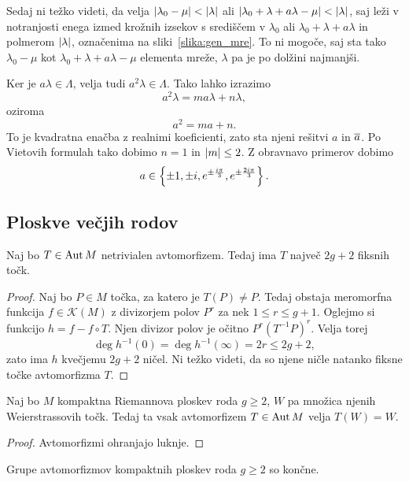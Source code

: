 Sedaj ni težko videti, da velja
$\left\lvert \lambda_0 - \mu\right\rvert < \left\lvert \lambda\right\rvert$ ali
$\left\lvert \lambda_0 + \lambda + a \lambda - \mu\right\rvert < \left\lvert \lambda\right\rvert$, saj
leži v notranjosti enega izmed krožnih izsekov s središčem v
$\lambda_0$ ali $\lambda_0 + \lambda + a \lambda$ in polmerom
$\left\lvert \lambda\right\rvert$, označenima na sliki~\ref{slika:gen_mre}. To ni
mogoče, saj sta tako $\lambda_0 - \mu$ kot
$\lambda_0 + \lambda + a \lambda - \mu$ elementa mreže, $\lambda$
pa je po dolžini najmanjši.

Ker je $a \lambda \in \Lambda$, velja tudi
$a^2 \lambda \in \Lambda$. Tako lahko izrazimo
\[
a^2 \lambda = m a \lambda + n \lambda,
\]
oziroma
\[
a^2 = ma + n.
\]
To je kvadratna enačba z realnimi koeficienti, zato sta njeni
rešitvi $a$ in $\overline{a}$. Po Vietovih formulah tako dobimo $n=1$
in $\left\lvert m\right\rvert \leq 2$. Z obravnavo primerov dobimo
\[
a \in \left\{\pm 1, \pm i,
e^{\pm \frac{i \pi}{3}}, e^{\pm \frac{2i \pi}{3}}\right\}.
\]

\subsection{Ploskve večjih rodov}

\begin{trditev}
Naj bo $T \in \operatorname{Aut} M$ netrivialen avtomorfizem. Tedaj ima $T$
največ $2g + 2$ fiksnih točk.
\end{trditev}

\begin{proof}
Naj bo $P \in M$ točka, za katero je $T(P) \ne P$. Tedaj obstaja
meromorfna funkcija $f \in \mathscr{K}(M)$ z divizorjem polov
$P^r$ za nek $1 \leq r \leq g + 1$. Oglejmo si funkcijo
$h = f - f \circ T$. Njen divizor polov je očitno
$P^r (T^{-1}P)^r$. Velja torej
\[
\deg h^{-1}(0) = \deg h^{-1}(\infty) = 2r \leq 2g + 2,
\]
zato ima $h$ kvečjemu $2g + 2$ ničel. Ni težko videti, da so njene
ničle natanko fiksne točke avtomorfizma $T$.
\end{proof}

\begin{lema}
Naj bo $M$ kompaktna Riemannova ploskev roda $g \geq 2$, $W$ pa
množica njenih Weierstrassovih točk. Tedaj ta vsak avtomorfizem
$T \in \operatorname{Aut} M$ velja $T(W) = W$.
\end{lema}

\begin{proof}
Avtomorfizmi ohranjajo luknje.
\end{proof}

\begin{izrek}[Schwarz]
Grupe avtomorfizmov kompaktnih ploskev roda $g \geq 2$ so končne.
\end{izrek}

